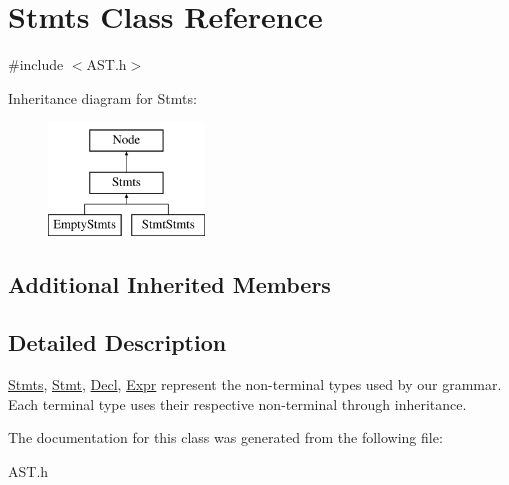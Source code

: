 \hypertarget{classStmts}{\section{Stmts Class Reference}
\label{classStmts}
}


{\ttfamily \#include $<$A\-S\-T.\-h$>$}

Inheritance diagram for Stmts\-:\begin{figure}[H]
\begin{center}
\leavevmode
\includegraphics[height=3.000000cm]{classStmts}
\end{center}
\end{figure}
\subsection*{Additional Inherited Members}


\subsection{Detailed Description}
\hyperlink{classStmts}{Stmts}, \hyperlink{classStmt}{Stmt}, \hyperlink{classDecl}{Decl}, \hyperlink{classExpr}{Expr} represent the non-\/terminal types used by our grammar. Each terminal type uses their respective non-\/terminal through inheritance. 

The documentation for this class was generated from the following file\-:\begin{DoxyCompactItemize}
\item 
A\-S\-T.\-h\end{DoxyCompactItemize}
